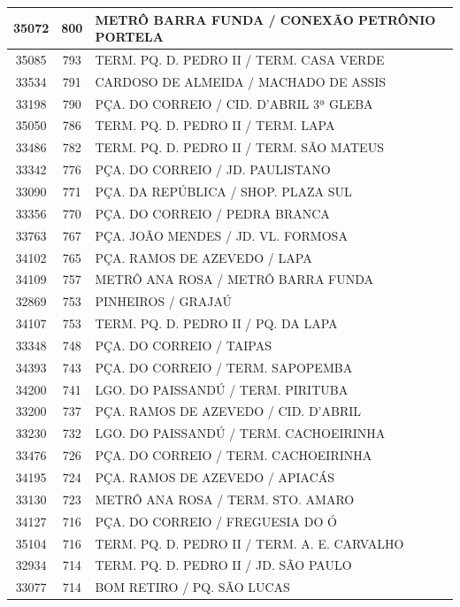 \documentclass[
	12pt,				%
	oneside,			%
	a4paper,			%
	english,			%
	brazil				%
	]{abntex2ppgsi}
\begin{document}
{{\begin{apendicesenv}
\begin{longtable}{c|c|p{7cm}}
 \hline 
35072 &	800 &	METRÔ BARRA FUNDA / CONEXÃO PETRÔNIO PORTELA \\ 
 \hline 
35085 &	793 &	TERM. PQ. D. PEDRO II / TERM. CASA VERDE \\ 
 \hline 
33534 &	791 &	CARDOSO DE ALMEIDA / MACHADO DE ASSIS \\ 
 \hline 
33198 &	790 &	PÇA. DO CORREIO / CID. D'ABRIL 3ª GLEBA \\ 
 \hline 
35050 &	786 &	TERM. PQ. D. PEDRO II / TERM. LAPA \\ 
 \hline 
33486 &	782 &	TERM. PQ. D. PEDRO II / TERM. SÃO MATEUS \\ 
 \hline 
33342 &	776 &	PÇA. DO CORREIO / JD. PAULISTANO \\ 
 \hline 
33090 &	771 &	PÇA. DA REPÚBLICA / SHOP. PLAZA SUL \\ 
 \hline 
33356 &	770 &	PÇA. DO CORREIO / PEDRA BRANCA \\ 
 \hline 
33763 &	767 &	PÇA. JOÃO MENDES / JD. VL. FORMOSA \\ 
 \hline 
34102 &	765 &	PÇA. RAMOS DE AZEVEDO / LAPA \\ 
 \hline 
34109 &	757 &	METRÔ ANA ROSA / METRÔ BARRA FUNDA \\ 
 \hline 
32869 &	753 &	PINHEIROS / GRAJAÚ \\ 
 \hline 
34107 &	753 &	TERM. PQ. D. PEDRO II / PQ. DA LAPA \\ 
 \hline 
33348 &	748 &	PÇA. DO CORREIO / TAIPAS \\ 
 \hline 
34393 &	743 &	PÇA. DO CORREIO / TERM. SAPOPEMBA \\ 
 \hline 
34200 &	741 &	LGO. DO PAISSANDÚ / TERM. PIRITUBA \\ 
 \hline 
33200 &	737 &	PÇA. RAMOS DE AZEVEDO / CID. D'ABRIL \\ 
 \hline 
33230 &	732 &	LGO. DO PAISSANDÚ / TERM. CACHOEIRINHA \\ 
 \hline 
33476 &	726 &	PÇA. DO CORREIO / TERM. CACHOEIRINHA \\ 
 \hline 
34195 &	724 &	PÇA. RAMOS DE AZEVEDO / APIACÁS \\ 
 \hline 
33130 &	723 &	METRÔ ANA ROSA / TERM. STO. AMARO \\ 
 \hline 
34127 &	716 &	PÇA. DO CORREIO / FREGUESIA DO Ó \\ 
 \hline 
35104 &	716 &	TERM. PQ. D. PEDRO II / TERM. A. E. CARVALHO \\ 
 \hline 
32934 &	714 &	TERM. PQ. D. PEDRO II / JD. SÃO PAULO \\ 
 \hline 
33077 &	714 &	BOM RETIRO / PQ. SÃO LUCAS \\ 

\end{longtable}
\end{apendicesenv}}}
\end{document}

